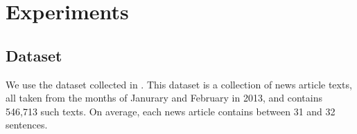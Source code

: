 \section{Experiments}

\subsection{Dataset}
We use the \newsspike{} dataset collected in \citet{zhang2013parallelparaphrase}.
This dataset is a collection of news article texts, all taken from the months of
Janurary and February in 2013, and contains 546,713 such texts. On average,
each news article contains between 31 and 32 sentences.

